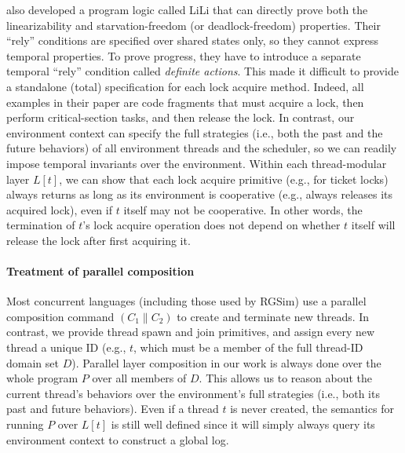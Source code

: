 \citet{lili16} also developed a program logic called LiLi that can
directly prove both the linearizability and starvation-freedom (or
deadlock-freedom) properties. Their ``rely'' conditions are specified
over shared states only, so they cannot express temporal properties. To
prove progress, they have to introduce a separate temporal ``rely''
condition called {\em definite actions}.  This made it difficult to
provide a standalone (total) specification for each lock acquire
method.  Indeed, all examples in their paper are code fragments that
must acquire a lock, then perform critical-section tasks, and then release the
lock. In contrast, our environment context can specify the full
strategies (i.e., both the past and the future behaviors) of all
environment threads and the scheduler, so we can readily impose
temporal invariants over the environment. Within each thread-modular
layer $L[t]$, we can show that each lock acquire primitive (e.g., for
ticket locks) always returns as long as its environment is cooperative
(e.g., always releases its acquired lock), even if $t$ itself may not
be cooperative.
In other words, the termination of $t$'s lock acquire
operation does not depend on whether $t$ itself will release the lock
after first acquiring it.


\paragraph{Treatment of parallel composition}
Most concurrent languages (including those used by RGSim) use a
parallel composition command $(C_1 \| C_2)$ to create and terminate
new threads.  In contrast, we provide thread spawn and join
primitives, and assign every new thread a unique ID (e.g., $t$, which
must be a member of the full thread-ID domain set $D$). Parallel layer
composition in our work is always done over the whole program $P$ over
all members of $D$. This allows us to reason about the current
thread's behaviors over the environment's full strategies (i.e., both
its past and future behaviors). Even if a thread $t$ is never
created, the semantics for running $P$ over $L[t]$ is still well
defined since it will simply always query its environment context to
construct a global log.

